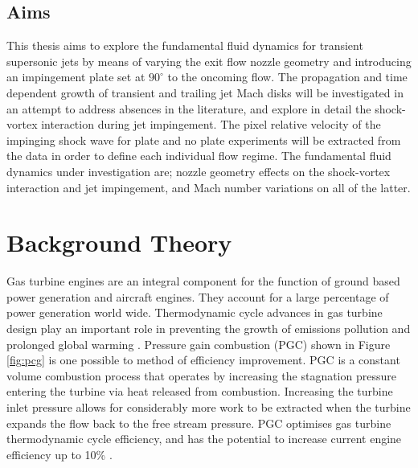 \subsection{Aims}
This thesis aims to explore the fundamental fluid dynamics for transient supersonic jets by means of varying the exit flow nozzle geometry and introducing an impingement plate set at $90^{\circ}$ to the oncoming flow. The propagation and time dependent growth of transient and trailing jet Mach disks will be investigated in an attempt to address absences in the literature, and explore in detail the shock-vortex interaction during jet impingement. The pixel relative velocity of the impinging shock wave for plate and no plate experiments will be extracted from the data in order to define each individual flow regime. The fundamental fluid dynamics under investigation are; nozzle geometry effects on the shock-vortex interaction and jet impingement, and Mach number variations on all of the latter.


\newpage

\section{Background Theory} \label{sec:background}
Gas turbine engines are an integral component for the function of ground based power generation and aircraft engines. They account for a large percentage of power generation world wide. Thermodynamic cycle advances in gas turbine design play an important role in preventing the growth of emissions pollution and prolonged global warming \cite{paxson2018pressure}. Pressure gain combustion (PGC) shown in Figure \ref{fig:pcg} is one possible to method of efficiency improvement. PGC is a constant volume combustion process that operates by increasing the stagnation pressure entering the turbine via heat released from combustion. Increasing the turbine inlet pressure allows for considerably more work to be extracted when the turbine expands the flow back to the free stream pressure. PGC optimises gas turbine thermodynamic cycle efficiency, and has the potential to increase current engine efficiency up to 10\% \cite{gulen2013constant}.

